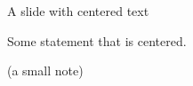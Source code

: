 \begin{frame}{A slide with centered text}

  \begin{center}
    Some statement that is centered.
  \end{center}

  \vspace{2ex}
  \begin{center}
    \scriptsize (a small note)
  \end{center}


\end{frame}